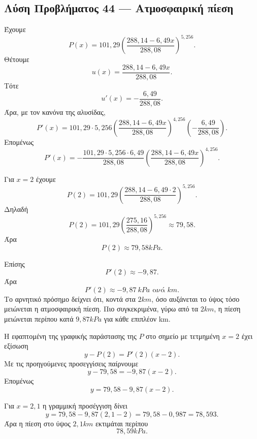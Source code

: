 \subsection*{Λύση Προβλήματος 44 --- Ατμοσφαιρική πίεση}

\begin{alist}
  \item Έχουμε
        \[
          P(x)=101{,}29
          \left(\frac{288{,}14-6{,}49x}{288{,}08}\right)^{5{,}256}.
        \]
        Θέτουμε
        \[
          u(x)=\frac{288{,}14-6{,}49x}{288{,}08}.
        \]
        Τότε
        \[
          u'(x)=-\frac{6{,}49}{288{,}08}.
        \]
        Άρα, με τον κανόνα της αλυσίδας,
        \[
          P'(x)
          =
          101{,}29\cdot 5{,}256
          \left(\frac{288{,}14-6{,}49x}{288{,}08}\right)^{4{,}256}
          \left(-\frac{6{,}49}{288{,}08}\right).
        \]
        Επομένως
        \[
          {
          P'(x)
          =
          -\frac{101{,}29\cdot 5{,}256\cdot 6{,}49}{288{,}08}
          \left(\frac{288{,}14-6{,}49x}{288{,}08}\right)^{4{,}256}
          }.
        \]

  \item Για $x=2$ έχουμε
        \[
          P(2)
          =
          101{,}29
          \left(\frac{288{,}14-6{,}49\cdot2}{288{,}08}\right)^{5{,}256}.
        \]
        Δηλαδή
        \[
          P(2)
          =
          101{,}29
          \left(\frac{275{,}16}{288{,}08}\right)^{5{,}256}
          \approx
          79{,}58.
        \]
        Άρα
        \[
          {P(2)\approx 79{,}58\si{kPa}}.
        \]

        Επίσης
        \[
          P'(2)\approx -9{,}87.
        \]
        Άρα
        \[
          {P'(2)\approx -9{,}87\ \si{kPa}\text{ ανά }\si{km}}.
        \]
        Το αρνητικό πρόσημο δείχνει ότι, κοντά στα $2\si{km}$, όσο
        αυξάνεται το ύψος τόσο μειώνεται η ατμοσφαιρική πίεση. Πιο
        συγκεκριμένα, γύρω από τα $2\si{km}$, η πίεση μειώνεται περίπου
        κατά $9{,}87\si{kPa}$ για κάθε επιπλέον \si{km}.

  \item Η εφαπτομένη της γραφικής παράστασης της $P$ στο σημείο με
        τετμημένη $x=2$ έχει εξίσωση
        \[
          y-P(2)=P'(2)(x-2).
        \]
        Με τις προηγούμενες προσεγγίσεις παίρνουμε
        \[
          y-79{,}58=-9{,}87(x-2).
        \]
        Επομένως
        \[
          {y=79{,}58-9{,}87(x-2)}.
        \]

        Για $x=2{,}1$ η γραμμική προσέγγιση δίνει
        \[
          y
          =
          79{,}58-9{,}87(2{,}1-2)
          =
          79{,}58-0{,}987
          =
          78{,}593.
        \]
        Άρα η πίεση στο ύψος $2{,}1\si{km}$ εκτιμάται περίπου
        \[
          {78{,}59\si{kPa}}.
        \]
\end{alist}
